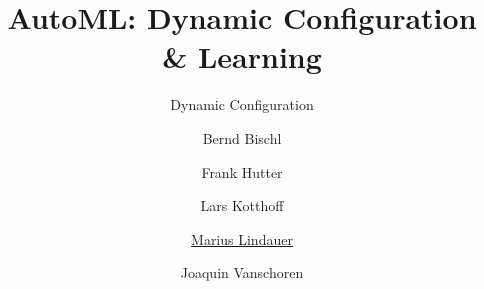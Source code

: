 




\title[AutoML: DAC]{AutoML: Dynamic Configuration \& Learning}
\subtitle{Dynamic Configuration}
\author[Marius Lindauer]{Bernd Bischl \and Frank Hutter \and Lars Kotthoff\newline \and \underline{Marius Lindauer} \and Joaquin Vanschoren}
\institute{}
\date{}





	
	\maketitle
	

